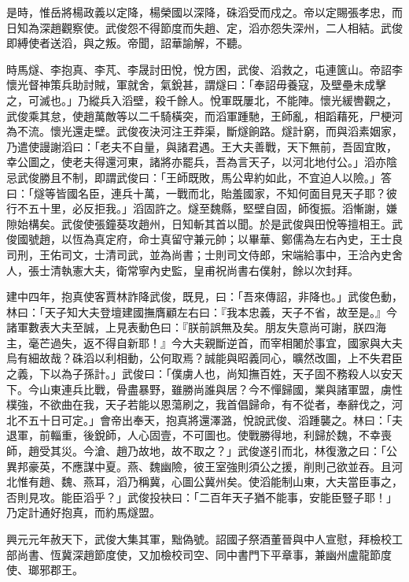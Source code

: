 \begin{pinyinscope}
 是時，惟岳將楊政義以定降，楊榮國以深降，硃滔受而戍之。帝以定賜張孝忠，而日知為深趙觀察使。武俊怨不得節度而失趙、定，滔亦怨失深州，二人相結。武俊即縛使者送滔，與之叛。帝聞，詔華諭解，不聽。



 時馬燧、李抱真、李芃、李晟討田悅，悅方困，武俊、滔救之，屯連篋山。帝詔李懷光督神策兵助討賊，軍就舍，氣銳甚，謂燧曰：「奉詔毋養寇，及壁壘未成擊之，可滅也。」乃縱兵入滔壁，殺千餘人。悅軍既屢北，不能陣。懷光緩轡觀之，武俊乘其怠，使趙萬敵等以二千騎橫突，而滔軍踵馳，王師亂，相蹈藉死，尸梗河為不流。懷光還走壁。武俊夜決河注王莽渠，斷燧餉路。燧計窮，而與滔素姻家，乃遣使謾謝滔曰：「老夫不自量，與諸君遇。王大夫善戰，天下無前，吾固宜敗，幸公圖之，使老夫得還河東，諸將亦罷兵，吾為言天子，以河北地付公。」滔亦陰忌武俊勝且不制，即謂武俊曰：「王師既敗，馬公卑約如此，不宜迫人以險。」答曰：「燧等皆國名臣，連兵十萬，一戰而北，貽羞國家，不知何面目見天子耶？彼行不五十里，必反拒我。」滔固許之。燧至魏縣，堅壁自固，師復振。滔慚謝，嫌隙始構矣。武俊使張鐘葵攻趙州，日知斬其首以聞。於是武俊與田悅等擅相王。武俊國號趙，以恆為真定府，命士真留守兼元帥；以畢華、鄭儒為左右內史，王士良司刑，王佑司文，士清司武，並為尚書；士則司文侍郎，宋端給事中，王洽內史舍人，張士清執憲大夫，衛常寧內史監，皇甫祝尚書右僕射，餘以次封拜。



 建中四年，抱真使客賈林詐降武俊，既見，曰：「吾來傳詔，非降也。」武俊色動，林曰：「天子知大夫登壇建國撫膺顧左右曰：『我本忠義，天子不省，故至是。』今諸軍數表大夫至誠，上見表動色曰：『朕前誤無及矣。朋友失意尚可謝，朕四海主，毫芒過失，返不得自新耶！』今大夫親斷逆首，而宰相闍於事宜，國家與大夫烏有細故哉？硃滔以利相動，公何取焉？誠能與昭義同心，曠然改圖，上不失君臣之義，下以為子孫計。」武俊曰：「僕虜人也，尚知撫百姓，天子固不務殺人以安天下。今山東連兵比戰，骨盡暴野，雖勝尚誰與居？今不憚歸國，業與諸軍盟，虜性樸強，不欲曲在我，天子若能以恩蕩刷之，我首倡歸命，有不從者，奉辭伐之，河北不五十日可定。」會帝出奉天，抱真將還澤潞，悅說武俊、滔踵襲之。林曰：「夫退軍，前輜重，後銳師，人心固壹，不可圖也。使戰勝得地，利歸於魏，不幸喪師，趙受其災。今滄、趙乃故地，故不取之？」武俊遂引而北，林復激之曰：「公異邦豪英，不應謀中夏。燕、魏幽險，彼王室強則須公之援，削則己欲並吞。且河北惟有趙、魏、燕耳，滔乃稱冀，心圖公冀州矣。使滔能制山東，大夫當臣事之，否則見攻。能臣滔乎？」武俊投袂曰：「二百年天子猶不能事，安能臣豎子耶！」乃定計通好抱真，而約馬燧盟。



 興元元年赦天下，武俊大集其軍，黜偽號。詔國子祭酒董晉與中人宣慰，拜檢校工部尚書、恆冀深趙節度使，又加檢校司空、同中書門下平章事，兼幽州盧龍節度使、瑯邪郡王。




\end{pinyinscope}
